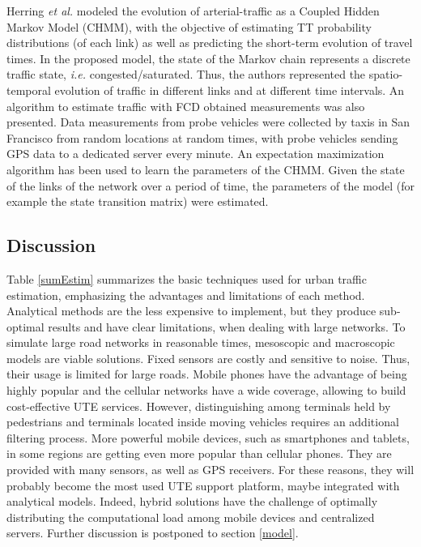 \documentclass[10pt,onecolumn]{article}
\begin{document}
Herring \textit{et al.} \cite{Herring2010} modeled the evolution of arterial-traffic as a Coupled Hidden Markov Model (CHMM), with the objective of estimating TT probability distributions (of each link) as well as predicting the short-term evolution of travel times. In the proposed model, the state of the Markov chain represents a discrete traffic state, \textit{i.e.} congested/saturated. Thus, the authors represented the spatio-temporal evolution of traffic in different links and at different time intervals. An algorithm to estimate traffic with FCD obtained measurements was also presented. Data measurements from probe vehicles were collected by  taxis in San Francisco from random locations at random times, with probe vehicles sending GPS data to a dedicated server every minute. An expectation maximization algorithm has been used to learn the parameters of the CHMM. Given the state of the links of the network over a period of time, the parameters of the model (for example the state transition matrix) 
were estimated.


\subsection{Discussion}

Table \ref{sumEstim} summarizes the basic techniques used for urban traffic estimation, emphasizing the advantages and limitations of each method. Analytical methods are the less expensive to implement, but they produce sub-optimal results and have clear limitations, when dealing with large networks. To simulate large road networks in reasonable times, mesoscopic and macroscopic models are viable solutions. Fixed sensors are costly and sensitive to noise. Thus, their usage is limited for large roads. Mobile phones have the advantage of being highly popular and the cellular networks have a wide coverage, allowing to build cost-effective UTE services.
However, distinguishing among terminals held by pedestrians and terminals located inside moving vehicles requires an additional filtering process. More powerful mobile devices, such as smartphones and tablets, in some regions are getting even more popular than cellular phones. They are provided with many sensors, as well as GPS receivers. For these reasons, they will probably become the most used UTE support platform, 
maybe integrated with analytical models. Indeed, hybrid solutions have the challenge of optimally distributing the computational load among mobile devices and centralized servers. 
Further discussion is postponed to section \ref{model}.
\end{document}

